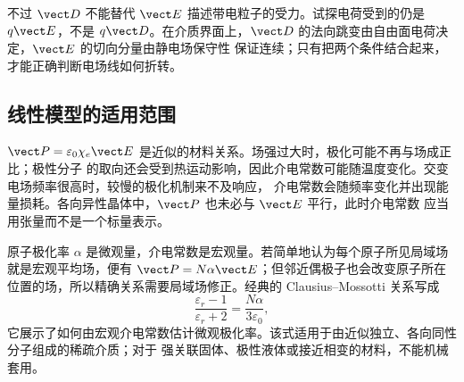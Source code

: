 不过 $\vect D$ 不能替代 $\vect E$ 描述带电粒子的受力。试探电荷受到的仍是 $q\vect E$，不是
$q\vect D$。在介质界面上，$\vect D$ 的法向跳变由自由面电荷决定，$\vect E$ 的切向分量由静电场保守性
保证连续；只有把两个条件结合起来，才能正确判断电场线如何折转。

\subsection*{线性模型的适用范围}

$\vect P=\varepsilon_0\chi_e\vect E$ 是近似的材料关系。场强过大时，极化可能不再与场成正比；极性分子
的取向还会受到热运动影响，因此介电常数可能随温度变化。交变电场频率很高时，较慢的极化机制来不及响应，
介电常数会随频率变化并出现能量损耗。各向异性晶体中，$\vect P$ 也未必与 $\vect E$ 平行，此时介电常数
应当用张量而不是一个标量表示。

原子极化率 $\alpha$ 是微观量，介电常数是宏观量。若简单地认为每个原子所见局域场就是宏观平均场，便有
$\vect P=N\alpha\vect E$；但邻近偶极子也会改变原子所在位置的场，所以精确关系需要局域场修正。经典的
Clausius--Mossotti 关系写成
\begin{equation}
  \boxed{\frac{\varepsilon_r-1}{\varepsilon_r+2}
  =\frac{N\alpha}{3\varepsilon_0}},
\end{equation}
它展示了如何由宏观介电常数估计微观极化率。该式适用于由近似独立、各向同性分子组成的稀疏介质；对于
强关联固体、极性液体或接近相变的材料，不能机械套用。
